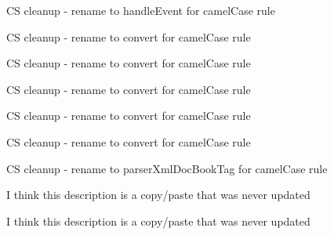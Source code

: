 \begin{DoxyRefList}
\item[\label{todo__todo000063}%
\hypertarget{todo__todo000063}{}%
\-Global \hyperlink{classparser_tag_adad166e90cd004e55cb685e890ef1c8e}{parser\-Tag} (\$a, \$desc)]\-C\-S cleanup -\/ rename to handle\-Event for camel\-Case rule  
\item[\label{todo__todo000119}%
\hypertarget{todo__todo000119}{}%
\-Global \hyperlink{classparser_toc_inline_tag_ad6c06bea9d11cc1c362b592306cfa707}{parser\-Toc\-Inline\-Tag} (\&\$c)]\-C\-S cleanup -\/ rename to convert for camel\-Case rule  
\item[\label{todo__todo000114}%
\hypertarget{todo__todo000114}{}%
\-Global \hyperlink{classparser_tutorial_inline_tag_ad6c06bea9d11cc1c362b592306cfa707}{parser\-Tutorial\-Inline\-Tag} (\&\$c)]\-C\-S cleanup -\/ rename to convert for camel\-Case rule  
\item[\label{todo__todo000070}%
\hypertarget{todo__todo000070}{}%
\-Global \hyperlink{classparser_tutorial_tag_a31e57fd66b58b300f8a489aa1b9431f6}{parser\-Tutorial\-Tag} (\&\$converter)]\-C\-S cleanup -\/ rename to convert for camel\-Case rule  
\item[\label{todo__todo000069}%
\hypertarget{todo__todo000069}{}%
\-Global \hyperlink{classparser_used_by_tag_ad6c06bea9d11cc1c362b592306cfa707}{parser\-Used\-By\-Tag} (\&\$c)]\-C\-S cleanup -\/ rename to convert for camel\-Case rule  
\item[\label{todo__todo000068}%
\hypertarget{todo__todo000068}{}%
\-Global \hyperlink{classparser_uses_tag_ad6c06bea9d11cc1c362b592306cfa707}{parser\-Uses\-Tag} (\&\$c)]\-C\-S cleanup -\/ rename to convert for camel\-Case rule  
\item[\label{todo__todo000137}%
\hypertarget{todo__todo000137}{}%
\-Global \hyperlink{classparser_x_m_l_doc_book_tag_a82914a103dc8d17dc8381487f3c2bc98}{parser\-X\-M\-L\-Doc\-Book\-Tag} (\$name)]\-C\-S cleanup -\/ rename to parser\-Xml\-Doc\-Book\-Tag for camel\-Case rule  
\item[\label{todo__todo000082}%
\hypertarget{todo__todo000082}{}%
\-Global \hyperlink{_errors_8inc_a25436b54459fc28d3cdf61a0d60bfb4c}{\-P\-D\-E\-R\-R\-O\-R\-\_\-\-C\-L\-A\-S\-S\-\_\-\-P\-A\-R\-E\-N\-T\-\_\-\-N\-O\-T\-\_\-\-F\-O\-U\-N\-D} ]\-I think this description is a copy/paste that was never updated  
\item[\label{todo__todo000081}%
\hypertarget{todo__todo000081}{}%
\-Global \hyperlink{_errors_8inc_a5ce27b5319c822cc387bb8510a31e440}{\-P\-D\-E\-R\-R\-O\-R\-\_\-\-N\-E\-E\-D\-\_\-\-W\-H\-I\-T\-E\-S\-P\-A\-C\-E} ]\-I think this description is a copy/paste that was never updated  

\end{DoxyRefList}
